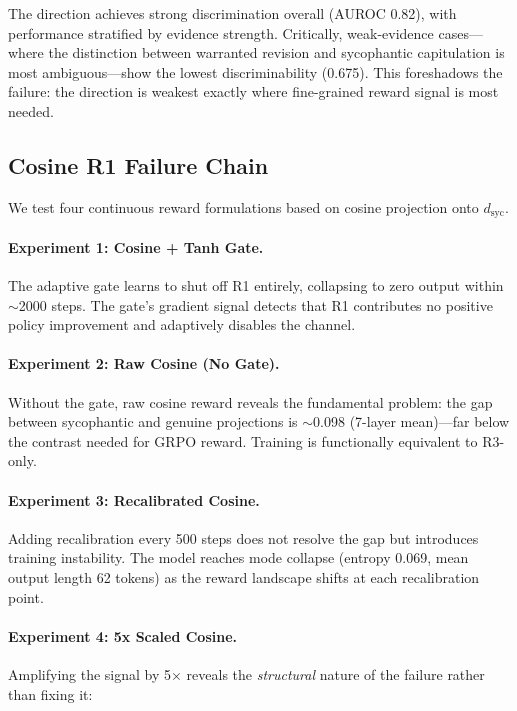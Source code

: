 \documentclass[11pt,a4paper]{article}
\begin{document}
The direction achieves strong discrimination overall (AUROC 0.82), with performance stratified by evidence strength. Critically, weak-evidence cases---where the distinction between warranted revision and sycophantic capitulation is most ambiguous---show the lowest discriminability (0.675). This foreshadows the failure: the direction is weakest exactly where fine-grained reward signal is most needed.

\subsection{Cosine R1 Failure Chain}

We test four continuous reward formulations based on cosine projection onto $d_\text{syc}$.

\paragraph{Experiment 1: Cosine + Tanh Gate.} The adaptive gate learns to shut off R1 entirely, collapsing to zero output within $\sim$2000 steps. The gate's gradient signal detects that R1 contributes no positive policy improvement and adaptively disables the channel.

\paragraph{Experiment 2: Raw Cosine (No Gate).} Without the gate, raw cosine reward reveals the fundamental problem: the gap between sycophantic and genuine projections is $\sim$0.098 (7-layer mean)---far below the contrast needed for GRPO reward. Training is functionally equivalent to R3-only.

\paragraph{Experiment 3: Recalibrated Cosine.} Adding recalibration every 500 steps does not resolve the gap but introduces training instability. The model reaches mode collapse (entropy 0.069, mean output length 62 tokens) as the reward landscape shifts at each recalibration point.

\paragraph{Experiment 4: 5x Scaled Cosine.} Amplifying the signal by 5$\times$ reveals the \emph{structural} nature of the failure rather than fixing it:
\end{document}
